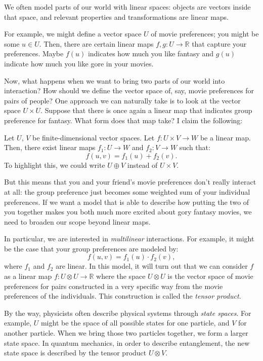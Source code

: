 We often model parts of our world with linear spaces: objects are
vectors inside that space, and relevant properties and transformations
are linear maps.  

For example, we might define a vector space $U$ of movie preferences;
you might be some $u \in U$. Then, there are certain linear maps $f,g
: U \to \mathbb{R}$ that capture your preferences. Maybe $f(u)$
indicates how much you like fantasy and $g(u)$ indicate how much you
like gore in your movies. 

Now, what happens when we want to bring two parts of our world into
interaction? How should we define the vector space of, say, movie
preferences for pairs of people? One approach we can naturally take is
to look at the vector space $U \times U$. Suppose that there is once
again a linear map that indicates group preference for fantasy. What
form does that map take? I claim the following: 

\begin{claim}\label{unique-decomposability}
Let $U$, $V$ be finite-dimensional vector spaces. Let $f : U \times V
\to W$ be a linear map. Then, there exist linear maps $f_1 : U \to W$
and $f_2: V \to W$ such that: 
\[f(u,v) = f_1(u) + f_2(v).\]
To highlight this, we could write $U \oplus V$ instead of $U \times V$.
\end{claim}

But this means that you and your friend's movie preferences don't
really interact at all: the group preference just becomes some
weighted sum of your individual preferences. If we want a model that
is able to describe how putting the two of you together makes you both
much more excited about gory fantasy movies, we need to broaden our
scope beyond linear maps. 

In particular, we are interested in \emph{multilinear}
interactions. For example, it might be the case that your group
preferences are modeled by: 
\[f(u,v) = f_1(u) \cdot f_2(v),\]
where $f_1$ and $f_2$ are linear.  In this model, it will turn out
that we can consider $f$ as a linear map $f: U \otimes U \to
\mathbb{R}$ where the space $U \otimes U$ is the vector space of movie
preferences for pairs constructed in a very specific way from the
movie preferences of the individuals. This construction is called the
\emph{tensor product}. 


By the way, physicists often describe physical systems through
\emph{state spaces}. For example, $U$ might be the space of all
possible states for one particle, and $V$ for another particle. When
we bring those two particles together, we form a larger state
space. In quantum mechanics, in order to describe entanglement, the
new state space is described by the tensor product $U \otimes V$. 

